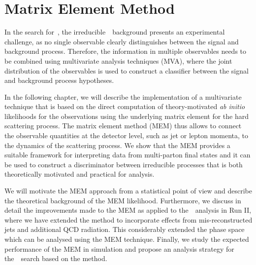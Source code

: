 \chapter{Matrix Element Method}
\label{sec:mem}
In the search for~\ttHbb, the irreducible~\ttbb~background presents an experimental challenge, as no single observable clearly distinguishes between the signal and background process. Therefore, the information in multiple observables needs to be combined using multivariate analysis techniques (MVA), where the joint distribution of the observables is used to construct a classifier between the signal and background process hypotheses.

In the following chapter, we will describe the implementation of a multivariate technique that is based on the direct computation of theory-motivated \textit{ab initio} likelihoods for the observations using the underlying matrix element for the hard scattering process. The matrix element method (MEM) thus allows to connect the observable quantities at the detector level, such as jet or lepton momenta, to the dynamics of the scattering process. We show that the MEM provides a suitable framework for interpreting data from multi-parton final states and it can be used to construct a discriminator between irreducible processes that is both theoretically motivated and practical for analysis.

We will motivate the MEM approach from a statistical point of view and describe the theoretical background of the MEM likelihood. Furthermore, we discuss in detail the improvements made to the MEM as applied to the~\ttHbb~analysis in Run II, where we have extended the method to incorporate effects from mis-reconstructed jets and additional QCD radiation. This considerably extended the phase space which can be analysed using the MEM technique. Finally, we study the expected performance of the MEM in simulation  and propose an analysis strategy for the~\ttHbb~search based on the method.

